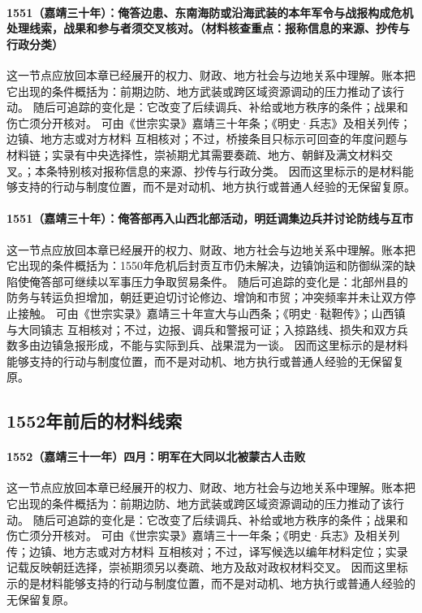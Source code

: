 \paragraph{1551（嘉靖三十年）：俺答边患、东南海防或沿海武装的本年军令与战报构成危机处理线索，战果和参与者须交叉核对。（材料核查重点：报称信息的来源、抄传与行政分类）} 这一节点应放回本章已经展开的权力、财政、地方社会与边地关系中理解。账本把它出现的条件概括为：前期边防、地方武装或跨区域资源调动的压力推动了该行动。 随后可追踪的变化是：它改变了后续调兵、补给或地方秩序的条件；战果和伤亡须分开核对。 可由《世宗实录》嘉靖三十年条；《明史·兵志》及相关列传；边镇、地方志或对方材料 互相核对；不过，桥接条目只标示可回查的年度问题与材料链；实录有中央选择性，崇祯期尤其需要奏疏、地方、朝鲜及满文材料交叉。；本条特别核对报称信息的来源、抄传与行政分类。 因而这里标示的是材料能够支持的行动与制度位置，而不是对动机、地方执行或普通人经验的无保留复原。

\paragraph{1551（嘉靖三十年）：俺答部再入山西北部活动，明廷调集边兵并讨论防线与互市} 这一节点应放回本章已经展开的权力、财政、地方社会与边地关系中理解。账本把它出现的条件概括为：1550年危机后封贡互市仍未解决，边镇饷运和防御纵深的缺陷使俺答部可继续以军事压力争取贸易条件。 随后可追踪的变化是：北部州县的防务与转运负担增加，朝廷更迫切讨论修边、增饷和市贸；冲突频率并未让双方停止接触。 可由《世宗实录》嘉靖三十年宣大与山西条；《明史·鞑靼传》；山西镇与大同镇志 互相核对；不过，边报、调兵和警报可证；入掠路线、损失和双方兵数多由边镇急报形成，不能与实际到兵、战果混为一谈。 因而这里标示的是材料能够支持的行动与制度位置，而不是对动机、地方执行或普通人经验的无保留复原。

\subsection{1552年前后的材料线索}

\paragraph{1552（嘉靖三十一年）四月：明军在大同以北被蒙古人击败} 这一节点应放回本章已经展开的权力、财政、地方社会与边地关系中理解。账本把它出现的条件概括为：前期边防、地方武装或跨区域资源调动的压力推动了该行动。 随后可追踪的变化是：它改变了后续调兵、补给或地方秩序的条件；战果和伤亡须分开核对。 可由《世宗实录》嘉靖三十一年条；《明史·兵志》及相关列传；边镇、地方志或对方材料 互相核对；不过，译写候选以编年材料定位；实录记载反映朝廷选择，崇祯期须另以奏疏、地方及敌对政权材料交叉。 因而这里标示的是材料能够支持的行动与制度位置，而不是对动机、地方执行或普通人经验的无保留复原。

